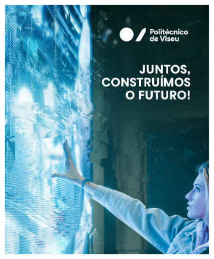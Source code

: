 \begin{figure}[!htbp]
    \centering
    \begin{subfigure}{0.3\textwidth}
        \centering
        \includegraphics[width=\textwidth]{Figuras/tablet1-2022.jpg}
        \caption{}
        \label{fig:juntos1}
    \end{subfigure}
    \hfill
    \begin{subfigure}{0.3\textwidth}
        \centering

\end{subfigure}
\end{figure}
